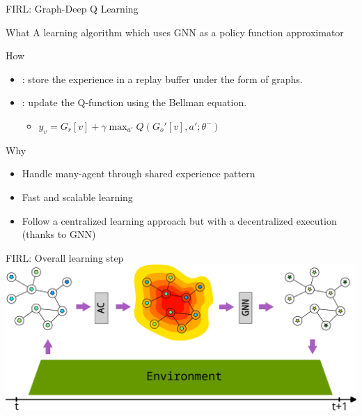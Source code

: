 \documentclass[presentation, 8pt,169]{beamer}\mode<presentation>{\usetheme{AMSBolognaFC}}
\begin{document}
\begin{frame}{FIRL: Graph-Deep Q Learning}
  \begin{block}{What}
    A learning algorithm which uses GNN as a policy function approximator
  \end{block}
  \begin{block}{How}
    \begin{itemize}
      \item {}: store the experience in a replay buffer under the form of graphs.
      \item {}: update the Q-function using the Bellman equation.
      \begin{itemize}
        \item $y_v = G_r[v] + \gamma \max_{a'} Q(G_o'[v], a'; \theta^-)$
      \end{itemize}
    \end{itemize}
  \end{block}
  \begin{alertblock}{Why}
    \begin{itemize}
      \item Handle many-agent through shared experience pattern 
      \item Fast and scalable learning 
      \item Follow a centralized learning approach but with a decentralized execution (thanks to GNN)
    \end{itemize}
  \end{alertblock}
\end{frame}
\begin{frame}{FIRL: Overall learning step}
\includegraphics[width=\textwidth]{img/architecture.pdf}
\end{frame}
\end{document}
